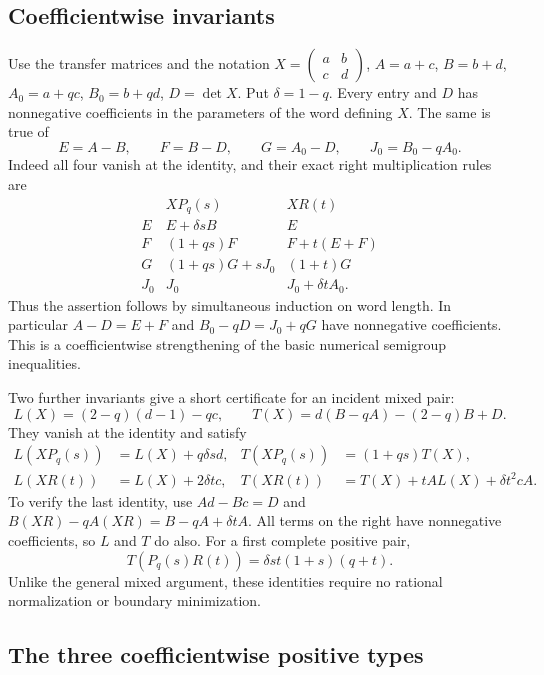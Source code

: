 \documentclass[11pt,a4paper]{article}
\theoremstyle{definition}
\theoremstyle{remark}\newtheorem{remark}[theorem]{Remark}
\begin{document}
\subsection{Coefficientwise invariants}

Use the transfer matrices and the notation
$X=\left(\begin{smallmatrix}a&b\\c&d\end{smallmatrix}\right)$,
$A=a+c$, $B=b+d$, $A_0=a+qc$, $B_0=b+qd$, $D=\det X$.
Put $\delta=1-q$.
Every entry and $D$ has nonnegative coefficients in the parameters
of the word defining $X$. The same is true of
\[
 E=A-B,\qquad F=B-D,\qquad G=A_0-D,\qquad J_0=B_0-qA_0.
\]
Indeed all four vanish at the identity, and their exact right
multiplication rules are
\[
\begin{array}{c|cc}
 & XP_q(s)&XR(t)\\ \hline
 E&E+\delta sB&E\\
 F&(1+qs)F&F+t(E+F)\\
 G&(1+qs)G+sJ_0&(1+t)G\\
 J_0&J_0&J_0+\delta tA_0 .
\end{array}
\]
Thus the assertion follows by simultaneous induction on word length.
In particular $A-D=E+F$ and $B_0-qD=J_0+qG$ have nonnegative
coefficients. This is a coefficientwise strengthening of the basic
numerical semigroup inequalities.

Two further invariants give a short certificate for an incident mixed
pair:
\[
 L(X)=(2-q)(d-1)-qc,\qquad
 T(X)=d(B-qA)-(2-q)B+D.
\]
They vanish at the identity and satisfy
\begin{align}
 L(XP_q(s))&=L(X)+q\delta sd,&
 T(XP_q(s))&=(1+qs)T(X),\label{eq:wheel-LT-P}\\
 L(XR(t))&=L(X)+2\delta tc,&
 T(XR(t))&=T(X)+tA L(X)+\delta t^2cA.
 \label{eq:wheel-LT-R}
\end{align}
To verify the last identity, use $Ad-Bc=D$ and
$B(XR)-qA(XR)=B-qA+\delta tA$. All terms on the right have
nonnegative coefficients, so $L$ and $T$ do also.
For a first complete positive pair,
\begin{equation}\label{eq:wheel-T-PR}
 T(P_q(s)R(t))=\delta st(1+s)(q+t).
\end{equation}
Unlike the general mixed argument, these identities require no rational
normalization or boundary minimization.

\subsection{The three coefficientwise positive types}
\end{document}
